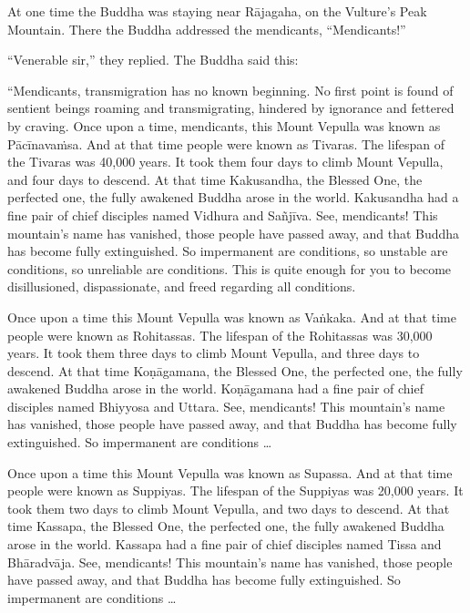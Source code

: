 \documentclass[12pt,openany]{book}%
\begin{document}
At one time the Buddha was staying near \textsanskrit{Rājagaha}, on the Vulture’s Peak Mountain. There the Buddha addressed the mendicants, “Mendicants!” 

“Venerable sir,” they replied. The Buddha said this: 

“Mendicants, transmigration has no known beginning. No first point is found of sentient beings roaming and transmigrating, hindered by ignorance and fettered by craving. Once upon a time, mendicants, this Mount Vepulla was known as \textsanskrit{Pācīnavaṁsa}. And at that time people were known as Tivaras. The lifespan of the Tivaras was 40,000 years. It took them four days to climb Mount Vepulla, and four days to descend. At that time Kakusandha, the Blessed One, the perfected one, the fully awakened Buddha arose in the world. Kakusandha had a fine pair of chief disciples named Vidhura and \textsanskrit{Sañjīva}. See, mendicants! This mountain’s name has vanished, those people have passed away, and that Buddha has become fully extinguished. So impermanent are conditions, so unstable are conditions, so unreliable are conditions. This is quite enough for you to become disillusioned, dispassionate, and freed regarding all conditions. 

Once upon a time this Mount Vepulla was known as \textsanskrit{Vaṅkaka}. And at that time people were known as Rohitassas. The lifespan of the Rohitassas was 30,000 years. It took them three days to climb Mount Vepulla, and three days to descend. At that time \textsanskrit{Koṇāgamana}, the Blessed One, the perfected one, the fully awakened Buddha arose in the world. \textsanskrit{Koṇāgamana} had a fine pair of chief disciples named Bhiyyosa and Uttara. See, mendicants! This mountain’s name has vanished, those people have passed away, and that Buddha has become fully extinguished. So impermanent are conditions … 

Once upon a time this Mount Vepulla was known as Supassa. And at that time people were known as Suppiyas. The lifespan of the Suppiyas was 20,000 years. It took them two days to climb Mount Vepulla, and two days to descend. At that time Kassapa, the Blessed One, the perfected one, the fully awakened Buddha arose in the world. Kassapa had a fine pair of chief disciples named Tissa and \textsanskrit{Bhāradvāja}. See, mendicants! This mountain’s name has vanished, those people have passed away, and that Buddha has become fully extinguished. So impermanent are conditions … 
\end{document}
